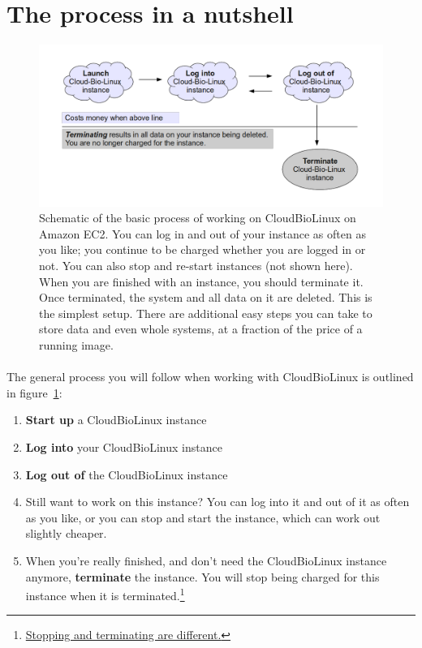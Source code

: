 \section{The process in a nutshell}

\begin{figure}[!hd]
	\fbox
	{
		\begin{minipage}{13cm}
\includegraphics[width=\maxwidth]{"images/nutshell"}
\caption[Start an Instance]{\label{fig:nutshell}Schematic of the basic process of working on CloudBioLinux on Amazon EC2. You can log in and out of your instance as often as you like; you continue to be charged whether you are logged in or not. You can also stop and re-start instances (not shown here). When you are finished with an instance, you should terminate it. Once terminated, the system and all data on it are deleted. This is the simplest setup. There are additional easy steps you can take to store data and even whole systems, at a fraction of the price of a running image.}
		\end{minipage}
	}
\end{figure}

\paragraph{}The general process you will follow when working with CloudBioLinux is outlined in figure~\ref{fig:nutshell}:
\begin{enumerate}
\item \textbf{Start up} a CloudBioLinux instance
\item \textbf{Log into} your CloudBioLinux instance
\item \textbf{Log out of} the  CloudBioLinux instance
\item Still want to work on this instance? You can log into it and out of it as often as you like, or you can stop and start the instance, which can work out slightly cheaper.
\item When you're really finished, and don't need the CloudBioLinux instance anymore, \textbf{terminate} the instance. You will stop being charged for this instance when it is terminated.\footnote{\href{http://support.rightscale.com/06-FAQs/FAQ\_0149\_-_What\%27s_the_difference_between_Terminating_and_Stopping_an_EC2_Instance\%3F}{Stopping and terminating are different.}}
\end{enumerate}

